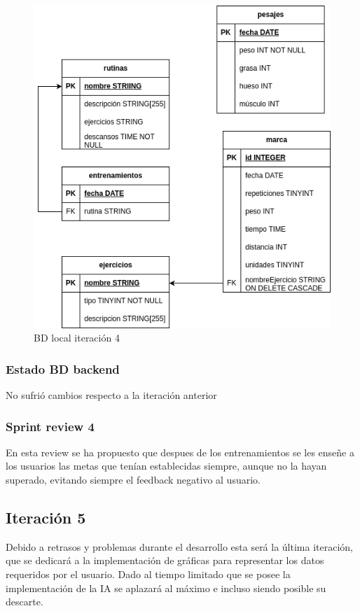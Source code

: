 \begin{figure}[H]
    \centering
    \includegraphics[width=\textwidth]{fotos/BDL iteracion 4.png}
    \caption{BD local iteración 4}
    \label{fig:BDL iteracion 4}
\end{figure}

\subsubsection{Estado BD backend}

No sufrió cambios respecto a la iteración anterior

\subsubsection{Sprint review 4}

En esta review se ha propuesto que despues de los entrenamientos se les enseñe a los usuarios las metas que tenían establecidas siempre, aunque no la hayan superado, evitando siempre el feedback negativo al usuario.

\subsection{Iteraci\'on 5} %

Debido a retrasos y problemas durante el desarrollo esta será la última iteración, que se dedicará a la implementación de gráficas para representar los datos requeridos por el usuario. Dado al tiempo limitado que se posee la implementación de la IA se aplazará al máximo e incluso siendo posible su descarte.
